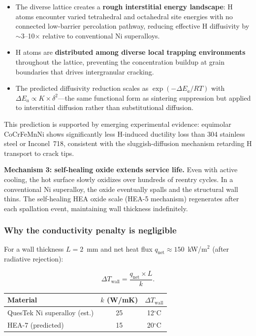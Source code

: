 \documentclass[12pt,letterpaper]{article}
\theoremstyle{definition}
\begin{document}
\begin{itemize}
  \item The diverse lattice creates a \textbf{rough interstitial energy landscape}: H atoms encounter varied tetrahedral and octahedral site energies with no connected low-barrier percolation pathway, reducing effective H diffusivity by $\sim$3--10$\times$ relative to conventional Ni superalloys.
  \item H atoms are \textbf{distributed among diverse local trapping environments} throughout the lattice, preventing the concentration buildup at grain boundaries that drives intergranular cracking.
  \item The predicted diffusivity reduction scales as $\exp(-\Delta E_a / RT)$ with $\Delta E_a \propto K \times \delta^2$---the same functional form as sintering suppression but applied to interstitial diffusion rather than substitutional diffusion.
\end{itemize}

This prediction is supported by emerging experimental evidence: equimolar CoCrFeMnNi shows significantly less H-induced ductility loss than 304 stainless steel or Inconel~718, consistent with the sluggish-diffusion mechanism retarding H transport to crack tips.

\textbf{Mechanism 3: self-healing oxide extends service life.}  Even with active cooling, the hot surface slowly oxidizes over hundreds of reentry cycles.  In a conventional Ni superalloy, the oxide eventually spalls and the structural wall thins.  The self-healing HEA oxide scale (HEA-5 mechanism) regenerates after each spallation event, maintaining wall thickness indefinitely.

\subsubsection{Why the conductivity penalty is negligible}

For a wall thickness $L = 2$~mm and net heat flux $q_{\mathrm{net}} \approx 150$~kW/m$^2$ (after radiative rejection):

\[
\Delta T_{\mathrm{wall}} = \frac{q_{\mathrm{net}} \times L}{k}.
\]

\begin{center}
\begin{tabular}{@{}lcc@{}}
\toprule
Material & $k$ (W/mK) & $\Delta T_{\mathrm{wall}}$ \\
\midrule
QuesTek Ni superalloy (est.) & 25 & 12$^\circ$C \\
HEA-7 (predicted) & 15 & 20$^\circ$C \\
\bottomrule
\end{tabular}
\end{center}
\end{document}
